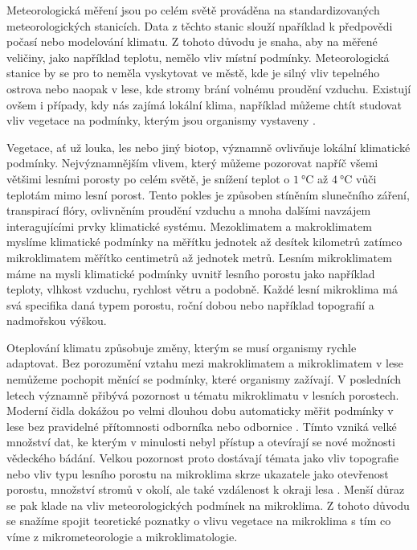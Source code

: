 Meteorologická měření jsou po celém světě prováděna na standardizovaných meteorologických stanicích. Data z těchto stanic slouží npaříklad k předpovědi počasí nebo modelování klimatu. Z tohoto důvodu je snaha, aby na měřené veličiny, jako například teplotu, nemělo vliv místní podmínky. Meteorologická stanice by se pro to neměla vyskytovat ve městě, kde je silný vliv tepelného ostrova nebo naopak v lese, kde stromy brání volnému proudění vzduchu. Existují ovšem i případy, kdy nás zajímá lokální klima, například můžeme chtít studovat vliv vegetace na podmínky, kterým jsou organismy vystaveny \parencite{ZellwegerFlorian2019Sdou}.

Vegetace, ať už louka, les nebo jiný biotop, významně ovlivňuje lokální klimatické podmínky. Nejvýznamnějším vlivem, který můžeme pozorovat napříč všemi většimi lesními porosty po celém světě, je snížení teplot o $\SI{1}{\celsius}$ až $\SI{4}{\celsius}$ vůči teplotám mimo lesní porost. Tento pokles je způsoben stíněním slunečního záření, transpirací flóry, ovlivněním proudění vzduchu a mnoha dalšími navzájem interagujícími prvky klimatické systému. Mezoklimatem a makroklimatem myslíme klimatické podmínky na měřítku jednotek až desítek kilometrů zatímco mikroklimatem měřítko centimetrů až jednotek metrů. Lesním mikroklimatem máme na mysli klimatické podmínky uvnitř lesního porostu jako například teploty, vlhkost vzduchu, rychlost větru a podobně. Každé lesní mikroklima má svá specifika daná typem porostu, roční dobou nebo například topografií a nadmořskou výškou.

Oteplování klimatu způsobuje změny, kterým se musí organismy rychle adaptovat. Bez porozumění vztahu mezi makroklimatem a mikroklimatem v lese nemůžeme pochopit měnící se podmínky, které organismy zažívají. V posledních letech významně přibývá pozornost u tématu mikroklimatu v lesních porostech. Moderní čidla dokážou po velmi dlouhou dobu automaticky měřit podmínky v lese bez pravidelné přítomnosti odborníka nebo odbornice \parencite{WildJan2019Caer}. Tímto vzniká velké množství dat, ke kterým v minulosti nebyl přístup a otevírají se nové možnosti vědeckého bádání. Velkou pozornost proto dostávají témata jako vliv topografie nebo vliv typu lesního porostu na mikroklima skrze ukazatele jako otevřenost porostu, množství stromů v okolí, ale také vzdálenost k okraji lesa \parencite{ZellwegerFlorian2019Sdou, predictingforestmicroclimate, snow_deFrenneForestMicroclimates, LindenmayerDavid2022Sard}. Menší důraz se pak klade na vliv meteorologických podmínek na mikroklima. Z tohoto důvodu se snažíme spojit teoretické poznatky o vlivu vegetace na mikroklima s tím co víme z mikrometeorologie a mikroklimatologie.

